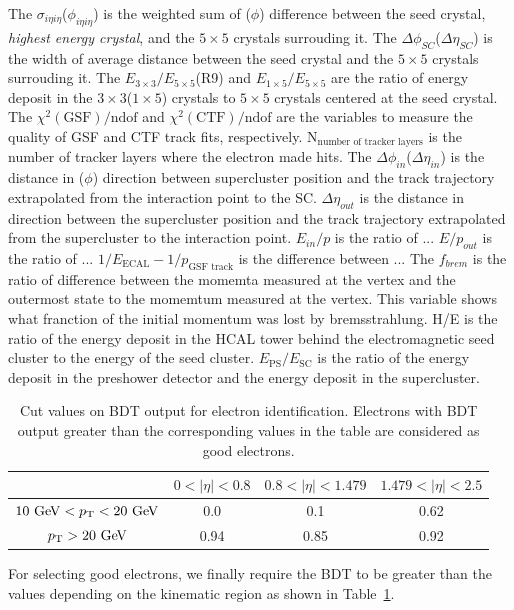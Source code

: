 The $\sigma_{i\eta i\eta}$($\phi_{i\eta i\eta}$) is the weighted sum of \Eta($\phi$) 
difference between the seed crystal, \textit{highest energy crystal}, 
and the $5\times5$ crystals surrouding it.
The $\Delta \phi_{SC}$($\Delta \eta_{SC}$) is the width of average distance 
between the seed crystal and the $5\times5$ crystals surrouding it.
The $E_{3\times3}/E_{5\times5}$(R9) and $E_{1\times5}/E_{5\times5}$ 
are the ratio of energy deposit in the $3\times3$($1\times5$) crystals to 
$5\times5$ crystals centered at the seed crystal. 
The $\chi^2(\textrm{GSF})/\textrm{ndof}$ and $\chi^2(\textrm{CTF})/\textrm{ndof}$
are the variables to measure the quality of GSF and CTF track fits, respectively. 
$\textrm{N}_\textrm{number of tracker layers}$ is the number of tracker layers 
where the electron made hits. 
The $\Delta \phi_{in}$($\Delta \eta_{in}$) is the distance in \Eta($\phi$) direction 
between supercluster position and the track trajectory extrapolated from the interaction point
to the SC. $\Delta \eta_{out}$ is the distance in \Eta{} direction
between the supercluster position and the track trajectory extrapolated 
from the supercluster to the interaction point.
$E_{in}/p$ is the ratio of  ... 
$E/p_{out}$ is the ratio of  ... 
$1/E_\textrm{ECAL} - 1/p_{\textrm{GSF track}}$ is the difference between ... 
The $f_{brem}$ is the ratio of difference between the momemta measured 
at the vertex and the outermost state to the momemtum measured at the 
vertex. This variable shows what franction of the initial momentum  
was lost by bremsstrahlung. 
H/E is the ratio of the energy deposit in the HCAL tower behind the electromagnetic 
seed cluster to the energy of the seed cluster.
$E_{\textrm{PS}}/E_{\textrm{SC}}$ is the ratio of the energy deposit in the preshower 
detector and the energy deposit in the supercluster. 
\begin{table}[!ht]
  \centering 
  \begin{tabular} {c||c|c|c}
  \hline
        & $0<|\eta|<0.8$ & $0.8<|\eta|<1.479$ & $1.479<|\eta|<2.5$\\
  \hline \hline
   $10~\mathrm{Ge\kern -0.1em V}<p_\mathrm{T}<20~\mathrm{Ge\kern -0.1em V}$    & 0.0   & 0.1   & 0.62 \\ 
  \hline
   $p_\mathrm{T}>20~\mathrm{Ge\kern -0.1em V}$            & 0.94  & 0.85  & 0.92 \\ 
  \hline 
  \end{tabular}
  \caption{Cut values on BDT output for electron identification. Electrons with BDT output
  greater than the corresponding values in the table are considered as good electrons.} 
  \label{tab:electronid_bdtcut}
\end{table}
For selecting good electrons, we finally require the BDT to be greater 
than the values depending on the kinematic region as shown in Table~\ref{tab:electronid_bdtcut}. 

